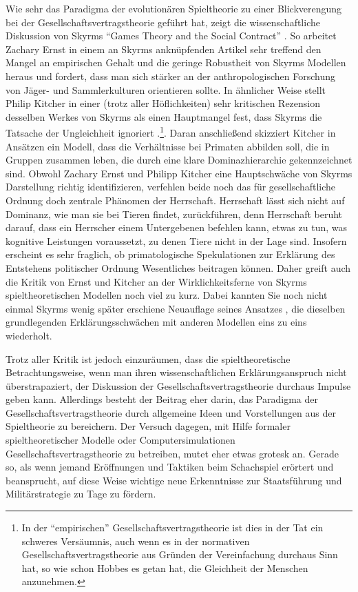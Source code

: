 \documentclass[12pt,a4paper,ngerman]{article}
\begin{document}
Wie sehr das Paradigma der evolutionären Spieltheorie zu einer
Blickverengung bei der Gesellschaftsvertragstheorie geführt hat, zeigt
die wissenschaftliche Diskussion von Skyrms "`Games Theory and the Social
Contract"' \cite{skyrms:1999}. So arbeitet Zachary Ernst in einem an
Skyrms anknüpfenden Artikel \cite[S. 6ff.]{ernst:2001} sehr treffend
den Mangel an empirischen Gehalt und die geringe Robustheit von Skyrms
Modellen heraus und fordert, dass man sich stärker an der
anthropologischen Forschung von Jäger- und Sammlerkulturen orientieren
sollte. In ähnlicher Weise stellt Philip Kitcher in einer (trotz aller
Höflichkeiten) sehr kritischen Rezension desselben Werkes von Skyrms
als einen Hauptmangel fest, dass Skyrms die Tatsache der Ungleichheit
ignoriert \cite[S. 223.]{kitcher:1999}.\footnote{In der "`empirischen"'
Gesellschaftsvertragstheorie ist dies in der Tat ein schweres
Versäumnis, auch wenn es in der normativen
Gesellschaftsvertragstheorie aus Gründen der Vereinfachung durchaus
Sinn hat, so wie schon Hobbes es getan hat, die Gleichheit der
Menschen anzunehmen.}.  Daran anschließend skizziert Kitcher in Ansätzen ein
Modell, dass die Verhältnisse bei Primaten abbilden soll, die in
Gruppen zusammen leben, die durch eine klare Dominazhierarchie
gekennzeichnet sind. Obwohl Zachary Ernst und Philipp Kitcher eine
Hauptschwäche von Skyrms Darstellung richtig identifizieren, verfehlen
beide noch das für gesellschaftliche Ordnung doch zentrale Phänomen
der Herrschaft. Herrschaft lässt sich nicht auf Dominanz, wie man sie
bei Tieren findet, zurückführen, denn Herrschaft beruht darauf, dass
ein Herrscher einem Untergebenen befehlen kann, etwas zu tun, was
kognitive Leistungen voraussetzt, zu denen Tiere nicht in der Lage
sind. Insofern erscheint es sehr fraglich, ob primatologische
Spekulationen zur Erklärung des Entstehens
politischer Ordnung Wesentliches beitragen können. Daher greift
auch die Kritik von Ernst und Kitcher an der Wirklichkeitsferne von
Skyrms spieltheoretischen Modellen noch viel zu kurz.  Dabei kannten
Sie noch nicht einmal Skyrms wenig später erschiene Neuauflage seines
Ansatzes \cite{skyrms:2004}, die dieselben grundlegenden
Erklärungsschwächen mit anderen Modellen eins zu eins wiederholt.

Trotz aller Kritik ist jedoch einzuräumen, dass die spieltheoretische
Betrachtungsweise, wenn man ihren wissenschaftlichen
Erklärungsanspruch nicht überstrapaziert, der Diskussion der
Gesellschaftsvertragstheorie durchaus Impulse geben kann. Allerdings
besteht der Beitrag eher darin, das Paradigma der
Gesellschaftsvertragstheorie durch allgemeine Ideen und Vorstellungen
aus der Spieltheorie zu bereichern. Der Versuch dagegen, mit Hilfe
formaler spieltheoretischer Modelle oder Computersimulationen
Gesellschaftsvertragstheorie zu betreiben, mutet eher etwas grotesk
an. Gerade so, als wenn jemand Eröffnungen und Taktiken beim
Schachspiel erörtert und beansprucht, auf diese Weise wichtige neue
Erkenntnisse zur Staatsführung und Militärstrategie zu Tage zu
fördern.
\end{document}
